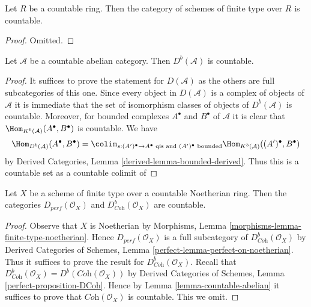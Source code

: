 \begin{lemma}
\label{lemma-countable-finite-type}
Let $R$ be a countable ring. Then the category of schemes of finite
type over $R$ is countable.
\end{lemma}

\begin{proof}
Omitted.
\end{proof}

\begin{lemma}
\label{lemma-countable-abelian}
Let $\mathcal{A}$ be a countable abelian category.
Then $D^b(\mathcal{A})$ is countable.
\end{lemma}

\begin{proof}
It suffices to prove the statement for $D(\mathcal{A})$ as the others
are full subcategories of this one. Since every object in $D(\mathcal{A})$
is a complex of objects of $\mathcal{A}$ it is immediate that the set of
isomorphism classes of objects of $D^b(\mathcal{A})$ is countable.
Moreover, for bounded complexes $A^\bullet$ and $B^\bullet$ of $\mathcal{A}$
it is clear that $\Hom_{K^b(\mathcal{A})}(A^\bullet, B^\bullet)$ is countable.
We have
$$
\Hom_{D^b(\mathcal{A})}(A^\bullet, B^\bullet) =
\colim_{s : (A')^\bullet \to A^\bullet\text{ qis and }(A')^\bullet\text{ bounded}}
\Hom_{K^b(\mathcal{A})}((A')^\bullet, B^\bullet)
$$
by Derived Categories, Lemma \ref{derived-lemma-bounded-derived}.
Thus this is a countable set as a countable colimit of
\end{proof}

\begin{lemma}
\label{lemma-countable-perfect}
Let $X$ be a scheme of finite type over a countable Noetherian ring.
Then the categories $D_{perf}(\mathcal{O}_X)$ and
$D^b_{\textit{Coh}}(\mathcal{O}_X)$ are countable.
\end{lemma}

\begin{proof}
Observe that $X$ is Noetherian by
Morphisms, Lemma \ref{morphisms-lemma-finite-type-noetherian}.
Hence $D_{perf}(\mathcal{O}_X)$ is a full subcategory of
$D^b_{\textit{Coh}}(\mathcal{O}_X)$ by
Derived Categories of Schemes, Lemma \ref{perfect-lemma-perfect-on-noetherian}.
Thus it suffices to prove
the result for $D^b_{\textit{Coh}}(\mathcal{O}_X)$.
Recall that
$D^b_{\textit{Coh}}(\mathcal{O}_X) = D^b(\textit{Coh}(\mathcal{O}_X))$
by
Derived Categories of Schemes, Lemma \ref{perfect-proposition-DCoh}.
Hence by Lemma \ref{lemma-countable-abelian}
it suffices to prove that $\textit{Coh}(\mathcal{O}_X)$ is
countable. This we omit.
\end{proof}


